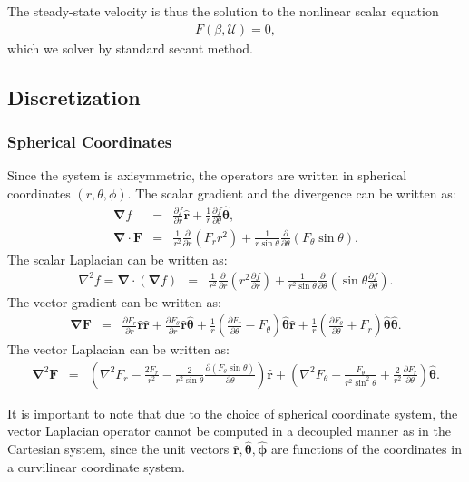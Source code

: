 \documentclass[final]{elsarticle}
\newcommand{\deriv}[2]{\frac{\partial #1}{\partial #2}}
\newcommand{\pars}[1]{\left(#1\right)}
\newcommand\Laplacian{\nabla^2}
\newcommand\bnabla{\boldsymbol{\nabla}}
\newcommand\bLaplacian{\boldsymbol{\nabla}^2}
\newcommand\bF{\boldsymbol{F}}
\newcommand\br{\boldsymbol{r}}
\newcommand\brhat{\hat{\br}}
\newcommand\btheta{\boldsymbol{\theta}}
\newcommand\bthetahat{\hat{\btheta}}
\newcommand\bphi{\boldsymbol{\phi}}
\newcommand\bphihat{\hat{\bphi}}
\newcommand\cU{\mathscr{U}}
\begin{document}
The steady-state velocity is thus the solution to the nonlinear scalar equation
\begin{eqnarray*}
F(\beta, \cU) = 0,
\end{eqnarray*}
which we solver by standard secant method.

\subsection{Discretization}
\subsubsection{Spherical Coordinates}
Since the system is axisymmetric, the operators are written in 
spherical coordinates $(r,\theta,\phi)$.
The scalar gradient and the divergence can be written as:
\begin{eqnarray*}
\bnabla f &=& \deriv{f}{r}\brhat + \frac{1}{r}\deriv{f}{\theta}\bthetahat, \\
\bnabla \cdot \bF &=& \frac{1}{r^2}\deriv{}{r}\pars{F_r r^2 } + 
               \frac{1}{r \sin\theta}\deriv{}{\theta}\pars{F_\theta \sin\theta}.
\end{eqnarray*}
The scalar Laplacian can be written as:
\begin{eqnarray*}
\Laplacian f = \bnabla \cdot (\bnabla f)&=& 
 \frac{1}{r^2}\deriv{}{r}\pars{r^2 \deriv{f}{r}} + 
 \frac{1}{r^2 \sin\theta}\deriv{}{\theta}\pars{\sin\theta \deriv{f}{\theta}}.
\end{eqnarray*}
The vector gradient can be written as:
\begin{eqnarray*}
\bnabla \bF &=& \deriv{F_r}{r} \brhat \brhat + \deriv{F_\theta}{r} \brhat \bthetahat + 
\frac{1}{r}\pars{\deriv{F_r}{\theta} - F_\theta} \bthetahat \brhat + 
\frac{1}{r}\pars{\deriv{F_\theta}{\theta} + F_r} \bthetahat \bthetahat.
\end{eqnarray*}
The vector Laplacian can be written as:
\begin{eqnarray*}
\bLaplacian \bF &=& 
\left(\Laplacian F_r - \frac{2F_r}{r^2} - 
\frac{2}{r^2 \sin\theta} \deriv{\left(F_\theta \sin\theta \right)}{\theta}\right)\brhat
+ \left(\Laplacian F_\theta - \frac{F_\theta}{r^2 \sin^2\theta} + 
\frac{2}{r^2}\deriv{F_r}{\theta}\right) \bthetahat.
\end{eqnarray*}

It is important to note that due to the choice of spherical coordinate system,
the vector Laplacian operator cannot be computed in a decoupled manner as in the Cartesian system,
since the unit vectors $\brhat, \bthetahat, \bphihat$ are functions of the coordinates
in a curvilinear coordinate system.
\end{document}
